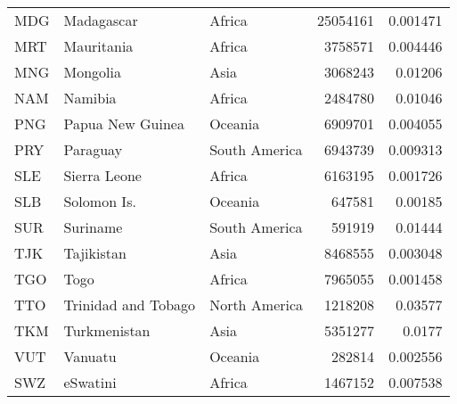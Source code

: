 \begin{table}[h!]
\begin{tabular}{lllrr}
      MDG     & Madagascar           & Africa        & 25054161 & 0.001471      \\
      MRT     & Mauritania           & Africa        & 3758571  & 0.004446      \\
      MNG     & Mongolia             & Asia          & 3068243  & 0.01206       \\
      NAM     & Namibia              & Africa        & 2484780  & 0.01046       \\
      PNG     & Papua New Guinea     & Oceania       & 6909701  & 0.004055      \\
      PRY     & Paraguay             & South America & 6943739  & 0.009313      \\
      SLE     & Sierra Leone         & Africa        & 6163195  & 0.001726      \\
      SLB     & Solomon Is.          & Oceania       & 647581   & 0.00185       \\
      SUR     & Suriname             & South America & 591919   & 0.01444       \\
      TJK     & Tajikistan           & Asia          & 8468555  & 0.003048      \\
      TGO     & Togo                 & Africa        & 7965055  & 0.001458      \\
      TTO     & Trinidad and Tobago  & North America & 1218208  & 0.03577       \\
      TKM     & Turkmenistan         & Asia          & 5351277  & 0.0177        \\
      VUT     & Vanuatu              & Oceania       & 282814   & 0.002556      \\
      SWZ     & eSwatini             & Africa        & 1467152  & 0.007538      \\
      \bottomrule
   \end{tabular}
\end{table}
